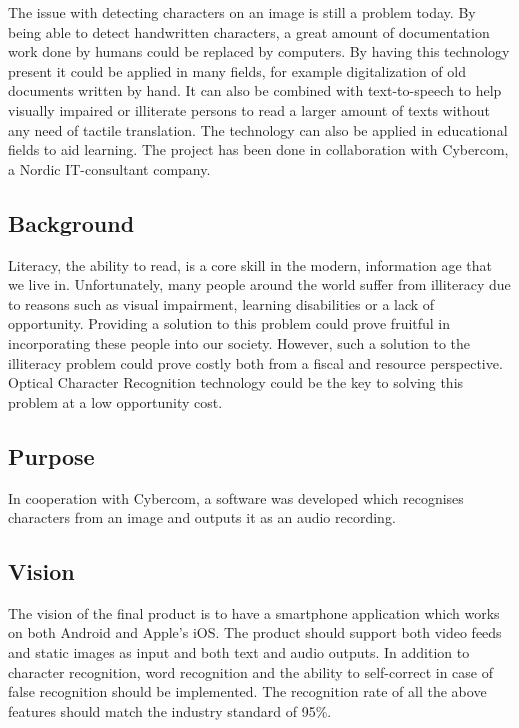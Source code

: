 \documentclass[../main.tex]{subfiles}
\begin{document}
The issue with detecting characters on an image is still a problem today. By
being able to detect handwritten characters, a great amount of documentation
work done by humans  could be replaced by computers. By having this technology
present it could be applied in many fields, for example digitalization of old
documents written by hand. It can also be combined with text-to-speech to help
visually impaired or illiterate persons to read a larger amount of texts
without any need of tactile translation. The technology can also be applied in
educational fields to aid learning. The project has been done in collaboration
with Cybercom, a Nordic IT-consultant company.

\subsection{Background}

Literacy, the ability to read, is a core skill in the modern, information age
that we live in. Unfortunately, many people around the world suffer from
illiteracy due to reasons such as visual impairment, learning disabilities or
a lack of opportunity. Providing a solution to this problem could prove
fruitful in incorporating these people into our society. However, such a
solution to the illiteracy problem could prove costly both from a fiscal and
resource perspective. Optical Character Recognition technology could be the
key to solving this problem at a low opportunity cost.

\subsection{Purpose}

In cooperation with Cybercom, a software was developed which recognises
characters from an image and outputs it as an audio recording.

\subsection{Vision}

The vision of the final product is to have a smartphone application which
works on both Android and Apple’s iOS. The product should support both video
feeds and static images as input and both text and audio outputs. In addition
to character recognition, word recognition and the ability to self-correct in
case of false recognition should be implemented. The recognition rate of all
the above features should match the industry standard of 95\%.
\end{document}
